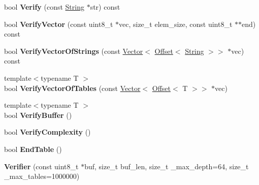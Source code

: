 \begin{DoxyCompactItemize}
\mbox{\label{classflatbuffers_1_1Verifier_a002e4665ec44b9eaaceac5577e507cba}} 
bool {\bfseries Verify} (const \hyperlink{structflatbuffers_1_1String}{String} $\ast$str) const
\item 
\mbox{\label{classflatbuffers_1_1Verifier_a774f3e1c1d7653133c3d964fd60fd39b}} 
bool {\bfseries Verify\+Vector} (const uint8\+\_\+t $\ast$vec, size\+\_\+t elem\+\_\+size, const uint8\+\_\+t $\ast$$\ast$end) const
\item 
\mbox{\label{classflatbuffers_1_1Verifier_a756e8f481ff1f9e81e7538df98475c6d}} 
bool {\bfseries Verify\+Vector\+Of\+Strings} (const \hyperlink{classflatbuffers_1_1Vector}{Vector}$<$ \hyperlink{structflatbuffers_1_1Offset}{Offset}$<$ \hyperlink{structflatbuffers_1_1String}{String} $>$$>$ $\ast$vec) const
\item 
\mbox{\label{classflatbuffers_1_1Verifier_a378bec2040b87ca1140b4da0d3a2181e}} 
{\footnotesize template$<$typename T $>$ }\\bool {\bfseries Verify\+Vector\+Of\+Tables} (const \hyperlink{classflatbuffers_1_1Vector}{Vector}$<$ \hyperlink{structflatbuffers_1_1Offset}{Offset}$<$ T $>$$>$ $\ast$vec)
\item 
\mbox{\label{classflatbuffers_1_1Verifier_af735887f16fb8adf22258967def32214}} 
{\footnotesize template$<$typename T $>$ }\\bool {\bfseries Verify\+Buffer} ()
\item 
\mbox{\label{classflatbuffers_1_1Verifier_a5844118cc57d9b95fd40ac3a69da0b81}} 
bool {\bfseries Verify\+Complexity} ()
\item 
\mbox{\label{classflatbuffers_1_1Verifier_ac0a269d5a9245a8efecd163ce08289d9}} 
bool {\bfseries End\+Table} ()
\item 
\mbox{\label{classflatbuffers_1_1Verifier_ab2305df3b2b5acb37c098717cdd6a0cd}} 
{\bfseries Verifier} (const uint8\+\_\+t $\ast$buf, size\+\_\+t buf\+\_\+len, size\+\_\+t \+\_\+max\+\_\+depth=64, size\+\_\+t \+\_\+max\+\_\+tables=1000000)
$$
\end{DoxyCompactItemize}
